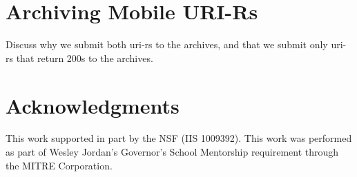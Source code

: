 \documentclass{sig-alternate}
\begin{document}
\section{Archiving Mobile URI-Rs}
\label{flow}

Discuss why we submit both uri-rs to the archives, and that we submit only uri-rs that return 200s to the archives. 

\section{Acknowledgments}
This work supported in part by the NSF (IIS 1009392). This work was performed as part of Wesley Jordan's Governor's School Mentorship requirement through the MITRE Corporation.



  
\end{document}
